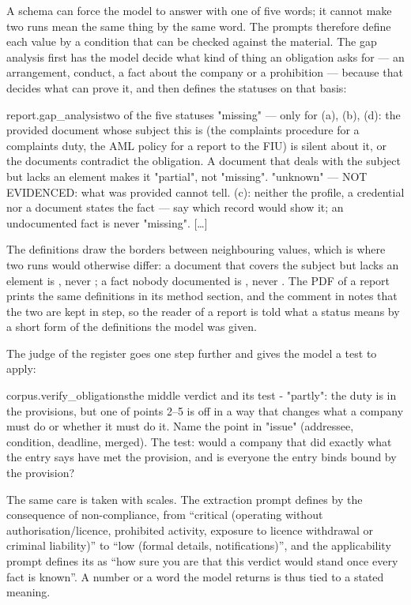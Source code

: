 A schema can force the model to answer with one of five words; it cannot make two runs mean
the same thing by the same word. The prompts therefore define each value by a condition that
can be checked against the material. The gap analysis first has the model decide what kind of
thing an obligation asks for — an arrangement, conduct, a fact about the company or a
prohibition — because that decides what can prove it, and then defines the statuses on that
basis:

\begin{promptexcerpt}{report.gap_analysis}{two of the five statuses}
"missing" — only for (a), (b), (d): the provided document whose subject this is
  (the complaints procedure for a complaints duty, the AML policy for a report to
  the FIU) is silent about it, or the documents contradict the obligation. A
  document that deals with the subject but lacks an element makes it "partial",
  not "missing".
"unknown" — NOT EVIDENCED: what was provided cannot tell. (c): neither the
  profile, a credential nor a document states the fact — say which record would
  show it; an undocumented fact is never "missing".
[…]
\end{promptexcerpt}

The definitions draw the borders between neighbouring values, which is where two runs would
otherwise differ: a document that covers the subject but lacks an element is ,
never ; a fact nobody documented is , never .
The PDF of a report prints the same definitions in its method section, and the comment in
 notes that the two are kept in step, so the reader of a report is told
what a status means by a short form of the definitions the model was given.

The judge of the register goes one step further and gives the model a test to apply:

\begin{promptexcerpt}{corpus.verify_obligations}{the middle verdict and its test}
- "partly": the duty is in the provisions, but one of points 2–5 is off in a way that changes what a company must do or whether it must do it. Name the point in "issue" (addressee, condition, deadline, merged). The test: would a company that did exactly what the entry says have met the provision, and is everyone the entry binds bound by the provision?
\end{promptexcerpt}

The same care is taken with scales. The extraction prompt defines  by the
consequence of non-compliance, from \enquote{critical (operating without
authorisation/licence, prohibited activity, exposure to licence withdrawal or criminal
liability)} to \enquote{low (formal details, notifications)}, and the applicability prompt
defines its  as \enquote{how sure you are that this verdict would stand once
every fact is known}. A number or a word the model returns is thus tied to a stated meaning.

